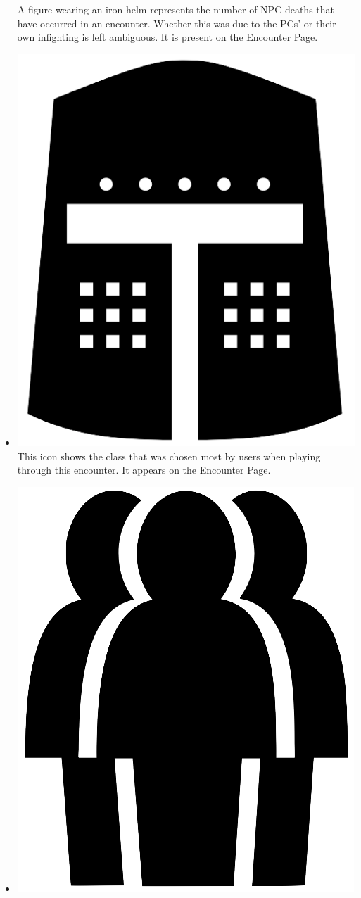 \documentclass[12pt,a4paper]{report}
\begin{document}
\begin{itemize}
		A figure wearing an iron helm represents the number of NPC deaths that have occurred in an encounter. Whether this was due to the PCs' or their own infighting is left ambiguous. It is present on the Encounter Page.
		\item \includegraphics[scale=.03]{most_popular_class}
		This icon shows the class that was chosen most by users when playing through this encounter. It appears on the Encounter Page.
		\item \includegraphics[scale=.03]{most_popular_race}

\end{itemize}
\end{document}
